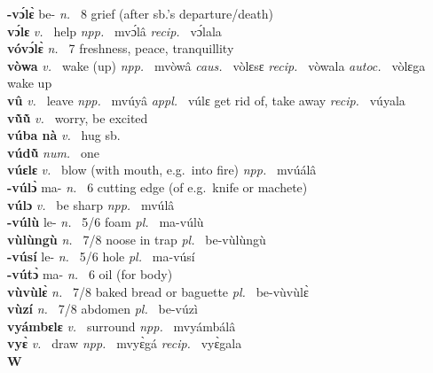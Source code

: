 {\bfseries -vɔ́lɛ̀} be- {\itshape n.~} 8 grief (after sb.'s departure/death)    \\ 
{\bfseries vɔ́lɛ}  {\itshape v.~} help   {\itshape npp.~} mvɔ́lâ {\itshape recip.~} vɔ́lala  \\ 
{\bfseries vóvɔ́lɛ̀}  {\itshape n.~} 7 freshness, peace, tranquillity   \\ 
{\bfseries vòwa}  {\itshape v.~} wake (up)   {\itshape npp.~} mvòwâ {\itshape caus.~} vòlɛsɛ {\itshape recip.~} vòwala {\itshape autoc.~} vòlɛga wake up  \\ 
{\bfseries vû}  {\itshape v.~} leave   {\itshape npp.~} mvúyâ {\itshape appl.~} vúlɛ get rid of, take away {\itshape recip.~} vúyala  \\ 
{\bfseries vũ̀ũ̀}  {\itshape v.~} worry, be excited    \\ 
{\bfseries vúba nà}  {\itshape v.~} hug sb.    \\ 
{\bfseries vúdũ̀}  {\itshape num.~} one    \\ 
{\bfseries vúɛlɛ}  {\itshape v.~} blow (with mouth, e.g.\ into fire)   {\itshape npp.~} mvúálâ  \\ 
{\bfseries -vúlɔ̀} ma- {\itshape n.~} 6 cutting edge (of e.g.\ knife or machete)   \\ 
{\bfseries vúlɔ}  {\itshape v.~} be sharp   {\itshape npp.~} mvúlâ  \\ 
{\bfseries -vúlù} le- {\itshape n.~} 5/6 foam {\itshape pl.~} ma-vúlù    \\ 
{\bfseries vùlùngù}  {\itshape n.~} 7/8 noose in trap {\itshape pl.~} be-vùlùngù    \\ 
{\bfseries -vúsí} le- {\itshape n.~} 5/6 hole {\itshape pl.~} ma-vúsí    \\ 
{\bfseries -vútɔ̀} ma- {\itshape n.~} 6 oil (for body)    \\ 
{\bfseries vùvùlɛ̀}  {\itshape n.~} 7/8 baked bread or baguette {\itshape pl.~} be-vùvùlɛ̀    \\ 
{\bfseries vùzí}  {\itshape n.~} 7/8 abdomen {\itshape pl.~} be-vúzì    \\ 
{\bfseries vyámbɛlɛ}  {\itshape v.~} surround   {\itshape npp.~} mvyámbálâ  \\ 
{\bfseries vyɛ̀}  {\itshape v.~} draw   {\itshape npp.~} mvyɛ̀gá {\itshape recip.~} vyɛ̀gala  \\ 

\medskip
\noindent \large {\bfseries W}\normalsize\\
\medskip

